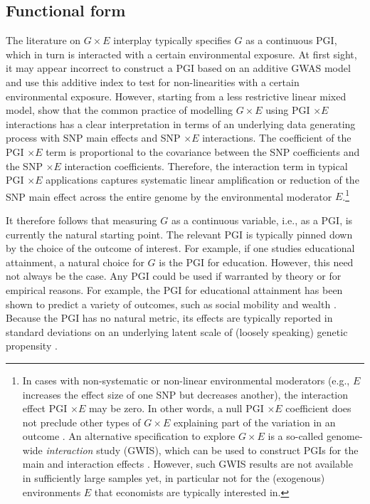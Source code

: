 \documentclass[12pt,a4paper]{article}
\begin{document}
\begin{bibunit}
\subsection{Functional form} \label{sec:missp}
The literature on $G \times E$ interplay typically specifies $G$ as a continuous PGI, which in turn is interacted with a certain environmental exposure. At first sight, it may appear incorrect to construct a PGI based on an additive GWAS model and use this additive index to test for non-linearities with a certain environmental exposure. However, starting from a less restrictive linear mixed model, \citet{miao2022reimagining} show that the common practice of modelling $G \times E$ using PGI $\times E$ interactions has a clear interpretation in terms of an underlying data generating process with SNP main effects and SNP $\times E$ interactions. The coefficient of the PGI $\times E$ term is proportional to the covariance between the SNP coefficients and the SNP $\times E$ interaction coefficients. Therefore, the interaction term in typical PGI $\times E$ applications captures systematic linear amplification or reduction of the SNP main effect across the entire genome by the environmental moderator $E$.\footnote{In cases with non-systematic or non-linear  environmental moderators (e.g., $E$ increases the effect size of one SNP but decreases another), the interaction effect PGI $\times E$ may be zero. In other words, a null PGI $\times E$ coefficient does not preclude other types of $G \times E$ explaining part of the variation in an outcome \citep[see][for more details and an empirical test for this case]{miao2022reimagining}. An alternative specification to explore $G \times E$ is a so-called genome-wide \textit{interaction} study (GWIS), which can be used to construct PGIs for the main and interaction effects \citep{jayasinghe2023gxe}. However, such GWIS results are not available in sufficiently large samples yet, in particular not for the (exogenous) environments $E$ that economists are typically interested in.} 

It therefore follows that measuring $G$ as a continuous variable, i.e., as a PGI, is currently the natural starting point. The relevant PGI is typically pinned down by the choice of the outcome of interest. For example, if one studies educational attainment, a natural choice for $G$ is the PGI for education. However, this need not always be the case. Any PGI could be used if warranted by theory or for empirical reasons. For example, the PGI for educational attainment has been shown to predict a variety of outcomes, such as social mobility and wealth \citep{Belsky2016,Belsky2018mobility,papageorge2020genes, barth2020genetic}. Because the PGI has no natural metric, its effects are typically reported in standard deviations on an underlying latent scale of (loosely speaking) genetic propensity \citep{Becker2021}.


\end{bibunit}
\end{document}
